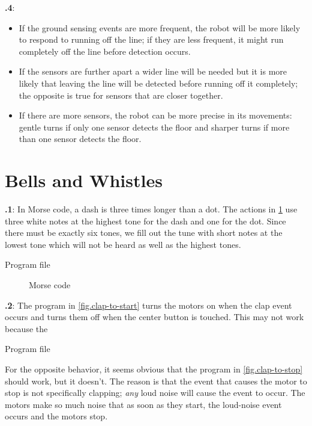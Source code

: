 \documentclass[11pt,a4paper,english]{article}
\begin{document}
\textbf{\thesection.4}:
\begin{itemize}
\item If the ground sensing events are more frequent, the robot will be
more likely to respond to running off the line; if they are less
frequent, it might run completely off the line before detection occurs.
\item If the sensors are further apart a wider line will be needed but
it is more likely that leaving the line will be detected before running
off it completely; the opposite is true for sensors that are closer
together.
\item If there are more sensors, the robot can be more precise in its
movements: gentle turns if only one sensor detects the floor and sharper
turns if more than one sensor detects the floor.
\end{itemize}

\section{Bells and Whistles}

\textbf{\thesection.1}:
In Morse code, a dash is three times longer than a dot. The actions in
\cref{fig.morse} use three white notes at the highest tone for the
dash and one for the dot. Since there must be exactly six tones, we fill
out the tune with short notes at the lowest tone which will not be heard
as well as the highest tones.

{\raggedleft \hfill Program file }

\begin{figure}
\begin{center}
\caption{Morse code}\label{fig.morse}
\end{center}
\end{figure}


\textbf{\thesection.2}: The program in \cref{fig.clap-to-start} turns
the motors on when the clap event occurs and turns them off when the
center button is touched. This may not work because the 

{\raggedleft \hfill Program file }

For the opposite behavior, it seems obvious that the program in
\cref{fig.clap-to-stop} should work, but it doesn't. The reason is
that the event that causes the motor to stop is not specifically
clapping; \emph{any} loud noise will cause the event to occur. The
motors make so much noise that as soon as they start, the loud-noise
event occurs and the motors stop.
\end{document}
